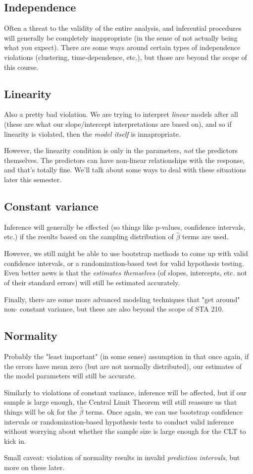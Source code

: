 \documentclass[titlepage, 12pt, leqno]{article}
\begin{document}
\subsection{Independence}
 Often a threat to the validity of the entire analysis,
and inferential procedures will generally be completely inappropriate (in the 
sense of not actually being what you expect). There are some ways around certain
types of independence violations (clustering, time-dependence, etc.), but
those are beyond the scope of this course.

\subsection{Linearity}
Also a pretty bad violation. We are trying to interpret
\textit{linear} models after all (these are what our slope/intercept
interpretations are based on), and so if linearity is violated, then the 
\textit{model itself} is innapropriate.

However, the linearity condition is only in the parameters, \textit{not}
the predictors themselves. The predictors can have non-linear relationships with
the response, and that's totally fine. We'll talk about some ways to deal with 
these situations later this semester.

\subsection{Constant variance}
Inference will generally be effected (so things like p-values, confidence
intervals, etc.) if the results based on the sampling distribution of 
$\hat \beta$ terms are used.

However, we still might be able to use bootstrap methods to come up with valid 
confidence intervals, or a randomization-based test for valid hypothesis testing.
Even better news is that the \textit{estimates themselves} (of slopes, 
intercepts, etc. not of their standard errors) will still be estimated accurately.

Finally, there are some more advanced modeling techniques that "get around" non-
constant variance, but these are also beyond the scope of STA 210.

\subsection{Normality}
Probably the "least important" (in some sense) assumption in that once again, if
the errors have mean zero (but are not normally distributed), our estimates of the
model parameters will still be accurate.

Similarly to violations of constant variance, inference will be affected, but if
our sample is large enough, the Central Limit Theorem will still reassure us that
things will be ok for the $\hat \beta$ terms. Once again, we can use bootstrap
confidence intervals or randomization-based hypothesis tests to conduct valid
inference without worrying about whether the sample size is large enough for the
CLT to kick in.

\begin{note}
    Small caveat: violation of normality results in invalid \textit{prediction
    intervals}, but more on these later.
\end{note}
\end{document}
